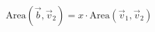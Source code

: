 \documentclass[preview]{standalone}
\begin{document}
\begin{align*}
\text{Area}(\vec{b}, \vec{v}_2) = x \cdot \text{Area}(\vec{v}_1, \vec{v}_2)
\end{align*}
\end{document}
